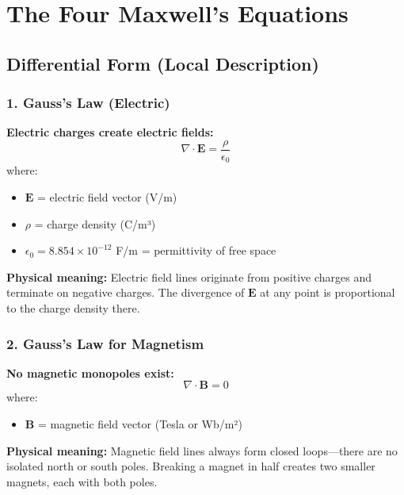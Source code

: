 \section{The Four Maxwell's Equations}

\subsection{Differential Form (Local Description)}

\subsubsection{1. Gauss's Law (Electric)}

\textbf{Electric charges create electric fields:}
\begin{equation}
\nabla \cdot \mathbf{E} = \frac{\rho}{\epsilon_0}
\label{eq:gauss-electric}
\end{equation}
where:
\begin{itemize}
\item $\mathbf{E}$ = electric field vector (V/m)
\item $\rho$ = charge density (C/m³)
\item $\epsilon_0 = 8.854 \times 10^{-12}$ F/m = permittivity of free space
\end{itemize}

\textbf{Physical meaning:} Electric field lines originate from positive charges and terminate on negative charges. The divergence of $\mathbf{E}$ at any point is proportional to the charge density there.

\subsubsection{2. Gauss's Law for Magnetism}

\textbf{No magnetic monopoles exist:}
\begin{equation}
\nabla \cdot \mathbf{B} = 0
\label{eq:gauss-magnetic}
\end{equation}
where:
\begin{itemize}
\item $\mathbf{B}$ = magnetic field vector (Tesla or Wb/m²)
\end{itemize}

\textbf{Physical meaning:} Magnetic field lines always form closed loops---there are no isolated north or south poles. Breaking a magnet in half creates two smaller magnets, each with both poles.

